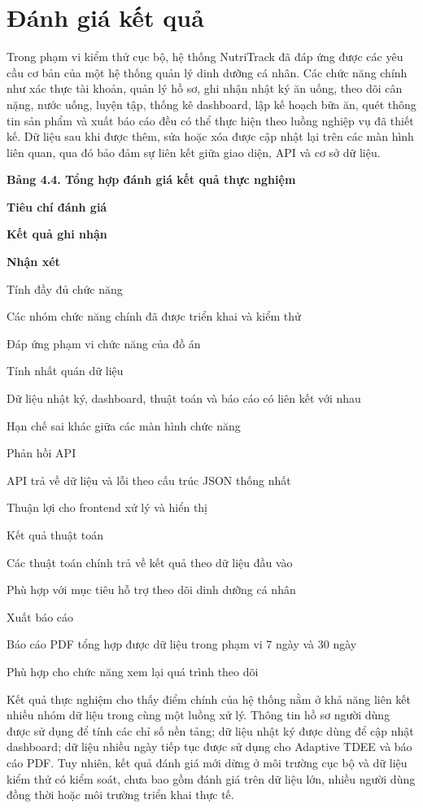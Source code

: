 \documentclass[12pt, a4paper]{report}
\begin{document}
\section{Đánh giá kết quả}Trong phạm vi kiểm thử cục bộ, hệ thống NutriTrack đã đáp ứng được các yêu cầu cơ bản của một hệ thống quản lý dinh dưỡng cá nhân. Các chức năng chính như xác thực tài khoản, quản lý hồ sơ, ghi nhận nhật ký ăn uống, theo dõi cân nặng, nước uống, luyện tập, thống kê dashboard, lập kế hoạch bữa ăn, quét thông tin sản phẩm và xuất báo cáo đều có thể thực hiện theo luồng nghiệp vụ đã thiết kế. Dữ liệu sau khi được thêm, sửa hoặc xóa được cập nhật lại trên các màn hình liên quan, qua đó bảo đảm sự liên kết giữa giao diện, API và cơ sở dữ liệu.

\textbf{Bảng 4.4. Tổng hợp đánh giá kết quả thực nghiệm}

\textbf{Tiêu chí đánh giá}

\textbf{Kết quả ghi nhận}

\textbf{Nhận xét}

Tính đầy đủ chức năng

Các nhóm chức năng chính đã được triển khai và kiểm thử

Đáp ứng phạm vi chức năng của đồ án

Tính nhất quán dữ liệu

Dữ liệu nhật ký, dashboard, thuật toán và báo cáo có liên kết với nhau

Hạn chế sai khác giữa các màn hình chức năng

Phản hồi API

API trả về dữ liệu và lỗi theo cấu trúc JSON thống nhất

Thuận lợi cho frontend xử lý và hiển thị

Kết quả thuật toán

Các thuật toán chính trả về kết quả theo dữ liệu đầu vào

Phù hợp với mục tiêu hỗ trợ theo dõi dinh dưỡng cá nhân

Xuất báo cáo

Báo cáo PDF tổng hợp được dữ liệu trong phạm vi 7 ngày và 30 ngày

Phù hợp cho chức năng xem lại quá trình theo dõi

Kết quả thực nghiệm cho thấy điểm chính của hệ thống nằm ở khả năng liên kết nhiều nhóm dữ liệu trong cùng một luồng xử lý. Thông tin hồ sơ người dùng được sử dụng để tính các chỉ số nền tảng; dữ liệu nhật ký được dùng để cập nhật dashboard; dữ liệu nhiều ngày tiếp tục được sử dụng cho Adaptive TDEE và báo cáo PDF. Tuy nhiên, kết quả đánh giá mới dừng ở môi trường cục bộ và dữ liệu kiểm thử có kiểm soát, chưa bao gồm đánh giá trên dữ liệu lớn, nhiều người dùng đồng thời hoặc môi trường triển khai thực tế.
\end{document}
